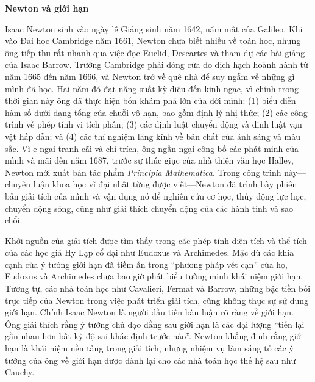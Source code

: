 \noindent
\begin{minipage}[t]{0.28\textwidth}
\vspace{0pt}
\begin{tcolorbox}[
  colback=white,
  colframe=stewartgreen,
  arc=0mm,
  boxrule=0.65pt,
  left=5.5pt,
  right=5.5pt,
  top=6pt,
  bottom=6pt,
  boxsep=0pt
]
{\color{stewartgreen}\fontsize{9.5pt}{12pt}\selectfont\textbf{\textsf{Newton và giới hạn}}}\par\vspace{5pt}
{\fontsize{8pt}{10.8pt}\selectfont
Isaac Newton sinh vào ngày lễ Giáng sinh năm 1642, năm mất của Galileo. Khi vào Đại học Cambridge năm 1661, Newton chưa biết nhiều về toán học, nhưng ông tiếp thu rất nhanh qua việc đọc Euclid, Descartes và tham dự các bài giảng của Isaac Barrow. Trường Cambridge phải đóng cửa do dịch hạch hoành hành từ năm 1665 đến năm 1666, và Newton trở về quê nhà để suy ngẫm về những gì mình đã học. Hai năm đó đạt năng suất kỳ diệu đến kinh ngạc, vì chính trong thời gian này ông đã thực hiện bốn khám phá lớn của đời mình: (1) biểu diễn hàm số dưới dạng tổng của chuỗi vô hạn, bao gồm định lý nhị thức; (2) các công trình về phép tính vi tích phân; (3) các định luật chuyển động và định luật vạn vật hấp dẫn; và (4) các thí nghiệm lăng kính về bản chất của ánh sáng và màu sắc. Vì e ngại tranh cãi và chỉ trích, ông ngần ngại công bố các phát minh của mình và mãi đến năm 1687, trước sự thúc giục của nhà thiên văn học Halley, Newton mới xuất bản tác phẩm \textit{Principia Mathematica}. Trong công trình này—chuyên luận khoa học vĩ đại nhất từng được viết—Newton đã trình bày phiên bản giải tích của mình và vận dụng nó để nghiên cứu cơ học, thủy động lực học, chuyển động sóng, cũng như giải thích chuyển động của các hành tinh và sao chổi.

\vspace{6pt}
Khởi nguồn của giải tích được tìm thấy trong các phép tính diện tích và thể tích của các học giả Hy Lạp cổ đại như Eudoxus và Archimedes. Mặc dù các khía cạnh của ý tưởng giới hạn đã tiềm ẩn trong “phương pháp vét cạn” của họ, Eudoxus và Archimedes chưa bao giờ phát biểu tường minh khái niệm giới hạn. Tương tự, các nhà toán học như Cavalieri, Fermat và Barrow, những bậc tiền bối trực tiếp của Newton trong việc phát triển giải tích, cũng không thực sự sử dụng giới hạn. Chính Isaac Newton là người đầu tiên bàn luận rõ ràng về giới hạn. Ông giải thích rằng ý tưởng chủ đạo đằng sau giới hạn là các đại lượng “tiến lại gần nhau hơn bất kỳ độ sai khác định trước nào”. Newton khẳng định rằng giới hạn là khái niệm nền tảng trong giải tích, nhưng nhiệm vụ làm sáng tỏ các ý tưởng của ông về giới hạn được dành lại cho các nhà toán học thế hệ sau như Cauchy.
\par}
\end{tcolorbox}
\end{minipage}%
